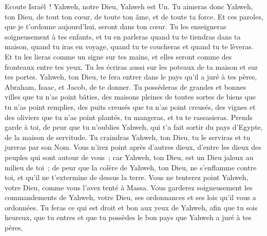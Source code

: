 \begin{multicols}{2}
Ecoute Israël~! Yahweh, notre Dieu, Yahweh est Un.
Tu aimeras donc Yahweh, ton Dieu, de tout ton cœur, de toute ton âme, et de toute ta force.
Et ces paroles, que je t'ordonne aujourd'hui, seront dans ton cœur.
Tu les enseigneras soigneusement à tes enfants, et tu en parleras quand tu te tiendras dans ta maison, quand tu iras en voyage, quand tu te coucheras et quand tu te lèveras.
Et tu les lieras comme un signe sur tes mains, et elles seront comme des fronteaux entre tes yeux.
Tu les écriras aussi sur les poteaux de ta maison et sur tes portes.
Yahweh, ton Dieu, te fera entrer dans le pays qu'il a juré à tes pères, Abraham, Isaac, et Jacob, de te donner. Tu posséderas de grandes et bonnes villes que tu n'as point bâties,
des maisons pleines de toutes sortes de biens que tu n'as point remplies, des puits creusés que tu n'as point creusés, des vignes et des oliviers que tu n'as point plantés, tu mangeras, et tu te rassasieras.
Prends garde à toi, de peur que tu n'oublies Yahweh, qui t'a fait sortir du pays d'Egypte, de la maison de servitude.
Tu craindras Yahweh, ton Dieu, tu le serviras et tu jureras par son Nom.
Vous n'irez point après d'autres dieux, d'entre les dieux des peuples qui sont autour de vous~;
car Yahweh, ton Dieu, est un Dieu jaloux au milieu de toi~; de peur que la colère de Yahweh, ton Dieu, ne s'enflamme contre toi, et qu'il ne t'extermine de dessus la terre.
Vous ne tenterez point Yahweh, votre Dieu, comme vous l'avez tenté à Massa.
Vous garderez soigneusement les commandements de Yahweh, votre Dieu, ses ordonnances et ses lois qu'il vous a ordonnées.
Tu feras ce qui est droit et bon aux yeux de Yahweh, afin que tu sois heureux, que tu entres et que tu possèdes le bon pays que Yahweh a juré à tes pères,

\end{multicols}
